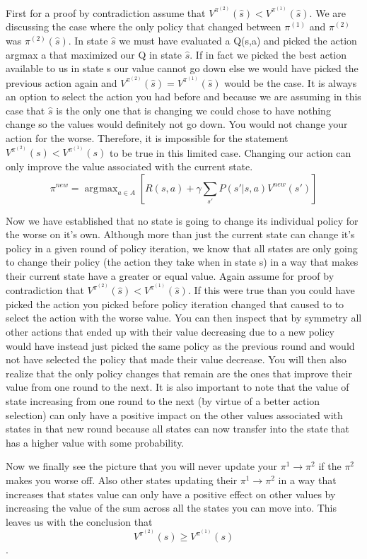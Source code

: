 \documentclass[solution, letterpaper]{cs121}
\DeclareMathOperator*{\argmax}{\arg\!\max}
\begin{document}
First for a proof by contradiction assume that  $V^{\pi^{(2)}} (\hat{s}) < V^{\pi^{(1)}}(\hat{s})$. We are discussing the case where the only policy that changed between  $\pi^{(1)}$ and $\pi^{(2)}$ was $\pi^{(2)}(\hat{s})$. In state $\hat{s}$ we must have evaluated a Q(s,a) and picked the action argmax a that maximized our Q in state $\hat{s}$. If in fact we picked the best action available to us in state s our value cannot go down else we would have picked the previous action again and $V^{\pi^{(2)}} (\hat{s}) = V^{\pi^{(1)}}(\hat{s})$ would be the case. It is always an option to select the action you had before and because we are assuming in this case that $\hat{s}$ is the only one that is changing we could chose to have nothing change so the values would definitely  not go down. You would not change your action for the worse. Therefore, it is impossible for the statement $V^{\pi^{(2)}} (s) < V^{\pi^{(1)}}(s)$ to be true in this limited case. Changing our action can only improve the value associated with the current state.
\[\pi^{new} = \argmax_{a \in A}  \left[ R(s,a ) + \gamma \sum_{s'} P(s' | s,a)V^{new}(s')\right ]\] 

Now we have established that no state is going to change its individual policy for the worse on it's own. Although more than just the current state can change it's policy in a given round of policy iteration, we know that all states are only going to change their policy (the action they take when in state s) in a way that makes their current state have a greater or equal value. 
Again assume for proof by contradiction that $V^{\pi^{(2)}} (\hat{s}) < V^{\pi^{(1)}}(\hat{s})$. If this were true than you could have picked the action you picked before policy iteration changed that caused to to select the action with the worse value. You can then inspect that by symmetry all other actions that ended up with their value decreasing due to a new policy would have instead just picked the same policy as the previous round and would not have selected the policy that made their value decrease. You will then also realize that the only policy changes that remain are the ones that improve their value from one round to the next. It is also important to note that the value of state increasing from one round to the next (by virtue of a better action selection) can only have a positive impact on the other values associated with states in that new round because all states can now transfer into the state that has a higher value with some probability. 

Now we finally see the picture that you will never update your $\pi^1 \rightarrow \pi^2$ if the $\pi^2$ makes you worse off. Also other states updating their $\pi^1 \rightarrow \pi^2$ in a way that increases that states value can only have a positive effect on other values by increasing the value of the sum across all the states you can move into. This leaves us with the conclusion that \[ V^{\pi^{(2)}} (s) \ge V^{\pi^{(1)}}(s) \].
\end{document}
